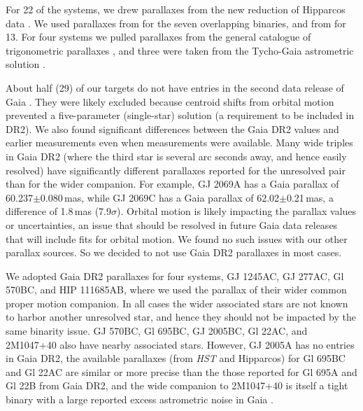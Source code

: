 \documentclass[twocolumn]{aastex62}
\begin{document}
For 22 of the systems, we drew parallaxes from the new reduction of Hipparcos data \citep{van-Leeuwen:2007yq}. We used parallaxes from \citet{Dupuy2017} for the seven overlapping binaries, and from \citet{Benedict2016} for 13. For four systems we pulled parallaxes from the general catalogue of trigonometric parallaxes \citep{van-Altena1995}, and three were taken from the Tycho-Gaia astrometric solution \citep[TGAS or Gaia DR1,][]{gaiadr1}.

About half (29) of our targets do not have entries in the second data release of Gaia \citep[DR2, ][]{GaiaDr2,Gaia-Collaboration:2018aa}. They were likely excluded because centroid shifts from orbital motion prevented a five-parameter (single-star) solution (a requirement to be included in DR2). We also found significant differences between the Gaia DR2 values and earlier measurements \citep[including from TGAS, ][]{2015A&A...574A.115M,gaiadr1} even when measurements were available. Many wide triples in Gaia DR2 (where the third star is several arc seconds away, and hence easily resolved) have significantly different parallaxes reported for the unresolved pair than for the wider companion. For example, GJ 2069A has a Gaia parallax of 60.237$\pm$0.080\,mas, while GJ 2069C has a Gaia parallax of 62.02$\pm$0.21\,mas, a difference of 1.8\,mas (7.9$\sigma$). Orbital motion is likely impacting the parallax values or uncertainties, an issue that should be resolved in future Gaia data releases that will include fits for orbital motion. We found no such issues with our other parallax sources. So we decided to not use Gaia DR2 parallaxes in most cases. 

We adopted Gaia DR2 parallaxes for four systems, GJ 1245AC, GJ 277AC, Gl 570BC, and HIP 111685AB, where we used the parallax of their wider common proper motion companion. In all cases the wider associated stars are not known to harbor another unresolved star, and hence they should not be impacted by the same binarity issue. GJ 570BC, Gl 695BC, GJ 2005BC, Gl 22AC, and 2M1047+40 also have nearby associated stars. %
However, GJ 2005A has no entries in Gaia DR2, the available parallaxes (from {\it HST} and Hipparcos) for Gl 695BC and Gl 22AC are similar or more precise than the those reported for Gl 695A and Gl 22B from Gaia DR2, and the wide companion to 2M1047+40 is itself a tight binary \citep[LP 213-67AB,][]{Dupuy2017} with a large reported excess astrometric noise in Gaia \citep[a sign of binarity,][]{2018RNAAS...2...20E}.
\end{document}
